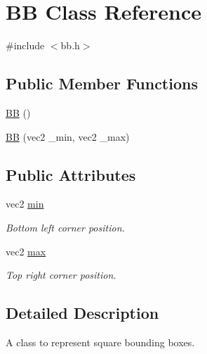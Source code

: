 \hypertarget{class_b_b}{\section{B\+B Class Reference}
\label{class_b_b}
}


{\ttfamily \#include $<$bb.\+h$>$}

\subsection*{Public Member Functions}
\begin{DoxyCompactItemize}
\item 
\hyperlink{class_b_b_a2a4045c7f1088d63abbd3d54dbe985d5}{B\+B} ()
\item 
\hyperlink{class_b_b_a5c43a5dc11191dc114ab101d52ea7905}{B\+B} (vec2 \+\_\+min, vec2 \+\_\+max)
\end{DoxyCompactItemize}
\subsection*{Public Attributes}
\begin{DoxyCompactItemize}
\item 
vec2 \hyperlink{class_b_b_ae7c37d7bd7024bf0077ab1b884aac982}{min}
\begin{DoxyCompactList}\small\item\em Bottom left corner position. \end{DoxyCompactList}\item 
vec2 \hyperlink{class_b_b_a460ea90989913b4fe860f404404ef650}{max}
\begin{DoxyCompactList}\small\item\em Top right corner position. \end{DoxyCompactList}\end{DoxyCompactItemize}


\subsection{Detailed Description}
A class to represent square bounding boxes. 

